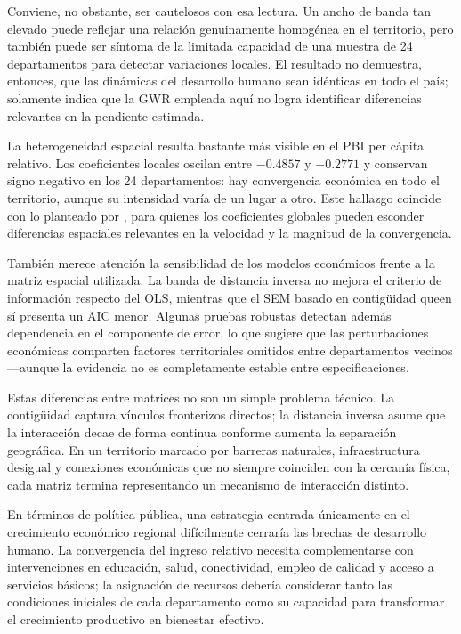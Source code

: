 Conviene, no obstante, ser cautelosos con esa lectura. Un ancho de banda tan
elevado puede reflejar una relación genuinamente homogénea en el territorio,
pero también puede ser síntoma de la limitada capacidad de una muestra de 24
departamentos para detectar variaciones locales. El resultado no demuestra,
entonces, que las dinámicas del desarrollo humano sean idénticas en todo el
país; solamente indica que la GWR empleada aquí no logra identificar
diferencias relevantes en la pendiente estimada.
 
La heterogeneidad espacial resulta bastante más visible en el PBI per
cápita relativo. Los coeficientes locales oscilan entre $-0.4857$ y
$-0.2771$ y conservan signo negativo en los 24 departamentos: hay
convergencia económica en todo el territorio, aunque su intensidad varía de
un lugar a otro. Este hallazgo coincide con lo planteado por
\textcite{duran2024}, para quienes los coeficientes globales pueden esconder
diferencias espaciales relevantes en la velocidad y la magnitud de la
convergencia.
 
También merece atención la sensibilidad de los modelos económicos frente a
la matriz espacial utilizada. La banda de distancia inversa no mejora el
criterio de información respecto del OLS, mientras que el SEM basado en
contigüidad queen sí presenta un AIC menor. Algunas pruebas robustas
detectan además dependencia en el componente de error, lo que sugiere que
las perturbaciones económicas comparten factores territoriales omitidos
entre departamentos vecinos —aunque la evidencia no es completamente
estable entre especificaciones.
 
Estas diferencias entre matrices no son un simple problema técnico. La
contigüidad captura vínculos fronterizos directos; la distancia inversa
asume que la interacción decae de forma continua conforme aumenta la
separación geográfica. En un territorio marcado por barreras naturales,
infraestructura desigual y conexiones económicas que no siempre coinciden
con la cercanía física, cada matriz termina representando un mecanismo de
interacción distinto.
 
En términos de política pública, una estrategia centrada únicamente en el
crecimiento económico regional difícilmente cerraría las brechas de
desarrollo humano. La convergencia del ingreso relativo necesita
complementarse con intervenciones en educación, salud, conectividad, empleo
de calidad y acceso a servicios básicos; la asignación de recursos debería
considerar tanto las condiciones iniciales de cada departamento como su
capacidad para transformar el crecimiento productivo en bienestar efectivo.
 
